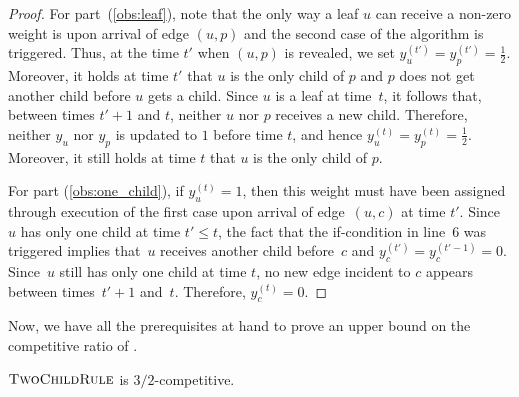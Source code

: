 \documentclass[a4paper,USenglish,cleveref,autoref,thm-restate,pdfa]{lipics-v2021}
\let\leq\leqslant
\begin{document}
\begin{proof}
For part~(\ref{obs:leaf}), note that the only way a leaf $u$ can receive a non-zero weight is upon arrival of edge $(u,p)$ and the second case of the algorithm is triggered.
Thus, at the time $t'$ when $(u,p)$ is revealed, we set $y_u^{(t')}=y_p^{(t')}=\frac12$.
Moreover, it holds at time $t'$ that $u$ is the only child of $p$ and $p$ does not get another child before $u$ gets a child.
Since $u$ is a leaf at time~$t$, it follows that, between times $t'+1$ and $t$, neither $u$ nor $p$ receives a new child.
Therefore, neither $y_u$ nor $y_p$ is updated to $1$ before time $t$, and hence $y_u^{(t)}=y_p^{(t)}=\frac12$.
Moreover, it still holds at time $t$ that $u$ is the only child of $p$.

  For part (\ref{obs:one_child}), if $y_u^{(t)}=1$, then this weight must have been assigned through execution of the first case upon arrival of edge~$(u,c)$ at time $t'$.
  Since $u$ has only one child at time $t'\leq t$, the fact that the if-condition in line~6 was triggered implies that~$u$ receives another child before~$c$ and $y_c^{(t')}=y_c^{(t'-1)}=0$.
Since~$u$ still has only one child at time $t$, no new edge incident to $c$ appears between times~$t'+1$ and~$t$.
Therefore, $y_c^{(t)}=0$.
\end{proof}

Now, we have all the prerequisites at hand to prove an upper bound on the competitive ratio of \twochild.

\begin{theorem}
$\textsc{TwoChildRule}$ is $3/2$-competitive.
\end{theorem}
\end{document}
